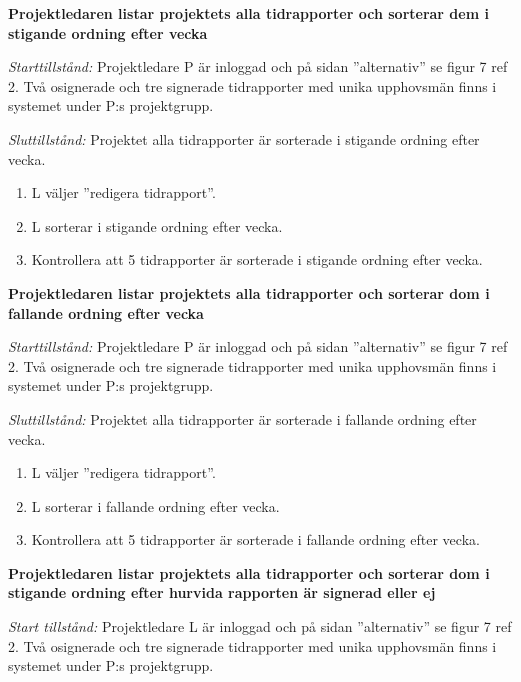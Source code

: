 \documentclass[a4paper]{article}
\begin{document}
\begin{FT}
\item %
\textbf{Projektledaren listar projektets alla tidrapporter och sorterar dem i stigande ordning efter vecka}

\emph{Starttillstånd:} Projektledare P är inloggad och på sidan ''alternativ'' se figur 7 ref 2. Två osignerade och tre signerade tidrapporter med unika upphovsmän finns i systemet under P:s projektgrupp.

\emph{Sluttillstånd:} Projektet alla tidrapporter är sorterade i stigande ordning efter vecka.

\begin{enumerate}
\item L väljer ''redigera tidrapport''.
\item L sorterar i stigande ordning efter vecka.
\item Kontrollera att 5 tidrapporter är sorterade i stigande ordning efter vecka.
\end{enumerate}


\item %
\textbf{Projektledaren listar projektets alla tidrapporter och sorterar dom i fallande ordning efter vecka} 

\emph{Starttillstånd:} Projektledare P är inloggad och på sidan ''alternativ'' se figur 7 ref 2. Två osignerade och tre signerade tidrapporter med unika upphovsmän finns i systemet under P:s projektgrupp.

\emph{Sluttillstånd:} Projektet alla tidrapporter är sorterade i fallande ordning efter vecka.

\begin{enumerate}
\item L väljer ''redigera tidrapport''.
\item L sorterar i fallande ordning efter vecka.
\item Kontrollera att 5 tidrapporter är sorterade i fallande ordning efter vecka.
\end{enumerate}

\item %
\textbf{Projektledaren listar projektets alla tidrapporter och sorterar dom i stigande ordning efter hurvida rapporten är signerad eller ej}

\emph{Start tillstånd:} Projektledare L är inloggad och på sidan ''alternativ'' se figur 7 ref 2. Två osignerade och tre signerade tidrapporter med unika upphovsmän finns i systemet under P:s projektgrupp.


\end{FT}
\end{document}
